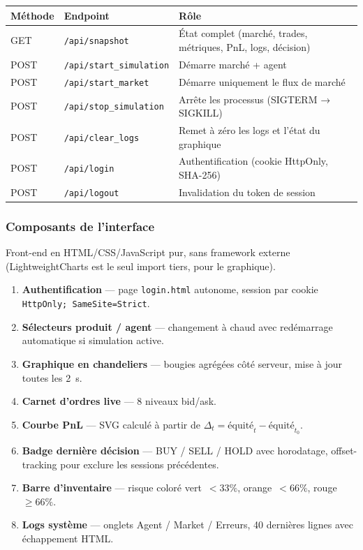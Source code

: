 \documentclass[11pt,a4paper]{article}
\begin{document}
\begin{center}
\footnotesize
\begin{tabular}{llp{7cm}}
    \toprule
    \textbf{Méthode} & \textbf{Endpoint} & \textbf{Rôle} \\
    \midrule
    GET  & \texttt{/api/snapshot}          & État complet (marché, trades, métriques, PnL, logs, décision) \\
    POST & \texttt{/api/start\_simulation} & Démarre marché + agent \\
    POST & \texttt{/api/start\_market}     & Démarre uniquement le flux de marché \\
    POST & \texttt{/api/stop\_simulation}  & Arrête les processus (SIGTERM → SIGKILL) \\
    POST & \texttt{/api/clear\_logs}       & Remet à zéro les logs et l'état du graphique \\
    POST & \texttt{/api/login}             & Authentification (cookie HttpOnly, SHA-256) \\
    POST & \texttt{/api/logout}            & Invalidation du token de session \\
    \bottomrule
\end{tabular}
\end{center}

\subsubsection{Composants de l'interface}

Front-end en HTML/CSS/JavaScript pur, sans framework externe
(LightweightCharts est le seul import tiers, pour le graphique).

\begin{enumerate}[leftmargin=1.2cm]
    \item \textbf{Authentification} --- page \texttt{login.html}
          autonome, session par cookie \texttt{HttpOnly; SameSite=Strict}.
    \item \textbf{Sélecteurs produit / agent} --- changement à chaud
          avec redémarrage automatique si simulation active.
    \item \textbf{Graphique en chandeliers} --- bougies agrégées
          côté serveur, mise à jour toutes les 2~s.
    \item \textbf{Carnet d'ordres live} --- 8 niveaux bid/ask.
    \item \textbf{Courbe PnL} --- SVG calculé à partir de
          $\Delta_t = \text{équité}_t - \text{équité}_{t_0}$.
    \item \textbf{Badge dernière décision} --- BUY / SELL / HOLD
          avec horodatage, offset-tracking pour exclure les
          sessions précédentes.
    \item \textbf{Barre d'inventaire} --- risque coloré
          vert~$<33\%$, orange~$<66\%$, rouge~$\geq66\%$.
    \item \textbf{Logs système} --- onglets Agent / Market / Erreurs,
          40 dernières lignes avec échappement HTML.
\end{enumerate}
\end{document}

